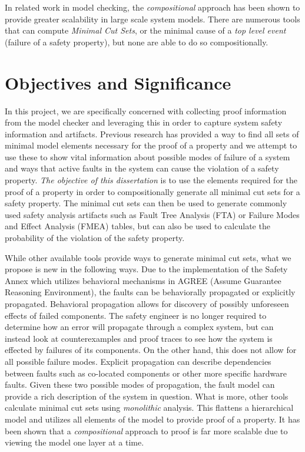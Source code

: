 In related work in model checking, the \emph{compositional} approach has been shown to provide greater scalability in large scale system models. There are numerous tools that can compute \emph{Minimal Cut Sets}, or the minimal cause of a \emph{top level event} (failure of a safety property), but none are able to do so compositionally. 

\section{Objectives and Significance}
In this project, we are specifically concerned with collecting proof information from the model checker and leveraging this in order to capture system safety information and artifacts. Previous research has provided a way to find all sets of minimal model elements necessary for the proof of a property and we attempt to use these to show vital information about possible modes of failure of a system and ways that active faults in the system can cause the violation of a safety property. \textit{The objective of this dissertation} is to use the elements required for the proof of a property in order to compositionally generate all minimal cut sets for a safety property. The minimal cut sets can then be used to generate commonly used safety analysis artifacts such as Fault Tree Analysis (FTA) or Failure Modes and Effect Analysis (FMEA) tables, but can also be used to calculate the probability of the violation of the safety property. 

While other available tools provide ways to generate minimal cut sets, what we propose is new in the following ways. Due to the implementation of the Safety Annex which utilizes behavioral mechanisms in AGREE (Assume Guarantee Reasoning Environment), the faults can be behaviorally propagated or explicitly propagated. Behavioral propagation allows for discovery of possibly unforeseen effects of failed components. The safety engineer is no longer required to determine how an error will propagate through a complex system, but can instead look at counterexamples and proof traces to see how the system is effected by failures of its components. On the other hand, this does not allow for all possible failure modes. Explicit propagation can describe dependencies between faults such as co-located components or other more specific hardware faults. Given these two possible modes of propagation, the fault model can provide a rich description of the system in question. What is more, other tools calculate minimal cut sets using \emph{monolithic} analysis. This flattens a hierarchical model and utilizes all elements of the model to provide proof of a property. It has been shown that a \emph{compositional} approach to proof is far more scalable due to viewing the model one layer at a time. 

